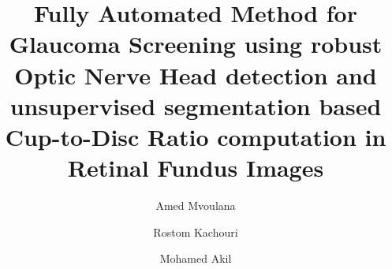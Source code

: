 \documentclass[review]{elsarticle}
\begin{document}
\begin{frontmatter}

\title{Fully Automated Method for Glaucoma Screening using robust Optic Nerve Head detection and unsupervised segmentation based Cup-to-Disc Ratio computation in Retinal Fundus Images}

\author[mymainaddress]{Amed Mvoulana}
\author[mymainaddress]{Rostom Kachouri} 
\author[mymainaddress]{Mohamed Akil}


\address[mymainaddress]{Gaspard-Monge Computer Science Laboratory, A3SI, ESIEE Paris, Université Paris-Est, Paris, France}

\begin{abstract}


\end{abstract}
\end{frontmatter}
\end{document}
